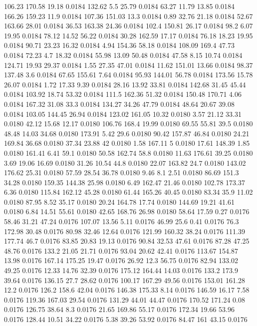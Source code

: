 106.23	170.58	19.18	0.0184
132.62	5.5	25.79	0.0184
63.27	11.79	13.85	0.0184
166.26	159.23	11.9	0.0184
107.36	151.03	13.3	0.0184
0.89	32.76	21.18	0.0184
52.67	163.66	28.01	0.0184
36.53	163.38	24.36	0.0184
102.4	150.81	26.17	0.0184
98.2	6.07	19.95	0.0184
78.12	14.52	56.22	0.0184
30.28	162.59	17.17	0.0184
76.18	18.23	19.95	0.0184
90.71	23.23	16.32	0.0184
4.94	154.36	58.18	0.0184
108.09	169.4	47.73	0.0184
72.23	4.7	18.32	0.0184
55.98	13.09	50.48	0.0184
47.58	8.15	10.74	0.0184
124.71	19.93	29.37	0.0184
1.55	27.35	47.01	0.0184
11.62	151.01	13.66	0.0184
98.37	137.48	3.6	0.0184
67.65	155.61	7.64	0.0184
95.93	144.01	56.78	0.0184
173.56	15.78	26.07	0.0184
1.72	17.33	9.39	0.0184
28.16	13.92	33.81	0.0184
142.68	31.45	45.44	0.0184
103.92	18.74	53.32	0.0184
111.5	162.36	51.32	0.0184
150.48	170.71	4.06	0.0184
167.32	31.08	33.3	0.0184
134.27	34.26	47.79	0.0184
48.64	20.67	39.08	0.0184
103.05	144.45	26.94	0.0184
123.02	161.05	10.32	0.0180
3.57	21.12	33.31	0.0180
42.12	15.68	12.17	0.0180
106.76	168.4	19.99	0.0180
69.55	55.81	39.5	0.0180
48.48	14.03	34.68	0.0180
173.91	5.42	29.6	0.0180
90.42	157.87	46.84	0.0180
24.21	169.84	36.68	0.0180
37.34	23.88	42	0.0180
1.58	167.11	5	0.0180
17.61	148.39	1.85	0.0180
161.41	6.41	59.1	0.0180
50.58	162.74	58.8	0.0180
11.63	176.61	39.25	0.0180
3.69	19.06	16.69	0.0180
31.26	10.54	44.8	0.0180
22.07	163.82	24.7	0.0180
143.02	176.62	25.31	0.0180
57.59	28.54	36.78	0.0180
9.46	8.1	2.51	0.0180
86.69	151.3	34.28	0.0180
159.35	144.38	25.98	0.0180
6.49	162.47	21.46	0.0180
102.78	173.37	6.36	0.0180
115.84	162.12	45.28	0.0180
61.44	165.26	40.45	0.0180
83.34	35.9	11.02	0.0180
87.95	8.52	35.17	0.0180
20.24	164.78	17.74	0.0180
144.69	19.21	41.61	0.0180
6.84	14.51	55.61	0.0180
42.65	168.76	26.98	0.0180
58.64	17.59	0.27	0.0176
58.46	31.21	47.24	0.0176
107.07	13.56	5.11	0.0176
46.99	25.6	0.41	0.0176
76.3	172.98	30.48	0.0176
80.98	32.46	12.64	0.0176
121.99	160.32	38.24	0.0176
111.39	177.74	46.7	0.0176
83.85	20.83	19.13	0.0176
90.84	32.53	47.61	0.0176
87.28	47.25	48.76	0.0176
133.2	21.05	21.71	0.0176
93.04	20.62	42.41	0.0176
113.67	154.87	13.98	0.0176
167.14	175.25	19.47	0.0176
26.92	12.3	56.75	0.0176
82.94	133.02	49.25	0.0176
12.33	14.76	32.39	0.0176
175.12	164.44	14.03	0.0176
133.2	173.9	39.64	0.0176
136.15	27.7	28.62	0.0176
100.17	167.29	49.56	0.0176
153.01	161.28	12.2	0.0176
126.2	158.6	42.04	0.0176
146.38	175.33	8.14	0.0176
146.59	16.17	7.58	0.0176
119.36	167.03	29.54	0.0176
131.29	44.01	44.47	0.0176
170.52	171.24	0.08	0.0176
126.75	38.64	8.3	0.0176
21.65	169.86	55.17	0.0176
172.34	19.66	53.96	0.0176
128.44	10.51	34.22	0.0176
5.38	39.26	53.92	0.0176
84.47	161	43.15	0.0176
